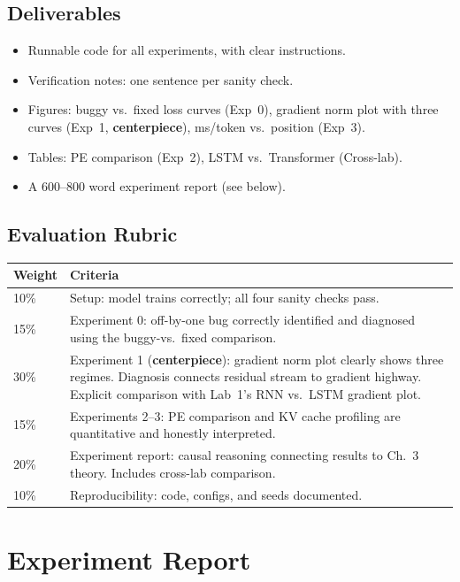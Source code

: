 \subsection*{Deliverables}

\begin{itemize}[nosep]
    \item Runnable code for all experiments, with clear instructions.
    \item Verification notes: one sentence per sanity check.
    \item Figures: buggy vs.\ fixed loss curves (Exp~0), gradient norm plot with three curves (Exp~1, \textbf{centerpiece}), ms/token vs.\ position (Exp~3).
    \item Tables: PE comparison (Exp~2), LSTM vs.\ Transformer (Cross-lab).
    \item A 600--800 word experiment report (see below).
\end{itemize}

\subsection*{Evaluation Rubric}

\begin{center}
\begin{tabular}{lp{}}
\toprule
Weight & Criteria \\
\midrule
10\% & Setup: model trains correctly; all four sanity checks pass. \\
15\% & Experiment 0: off-by-one bug correctly identified and diagnosed using the buggy-vs.\ fixed comparison. \\
30\% & Experiment 1 (\textbf{centerpiece}): gradient norm plot clearly shows three regimes. Diagnosis connects residual stream to gradient highway. Explicit comparison with Lab~1's RNN vs.\ LSTM gradient plot. \\
15\% & Experiments 2--3: PE comparison and KV cache profiling are quantitative and honestly interpreted. \\
20\% & Experiment report: causal reasoning connecting results to Ch.~3 theory. Includes cross-lab comparison. \\
10\% & Reproducibility: code, configs, and seeds documented. \\
\bottomrule
\end{tabular}
\end{center}


\section*{Experiment Report}

